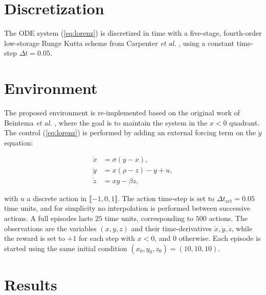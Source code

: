 \section{Discretization}

The ODE system (\ref{eq:lorenz}) is discretized in time with a five-stage, fourth-order low-storage Runge Kutta scheme from Carpenter \textit{et al.} \cite{carpenter1994}, using a constant time-step $\Delta t=0.05$.

\section{Environment}

The proposed environment is re-implemented based on the original work of Beintema \textit{et al.} \cite{beintema2020}, where the goal is to maintain the system in the $x<0$ quadrant. The control (\ref{eq:lorenz}) is performed by adding an external forcing term on the $\dot{y}$ equation:

\begin{equation}
\label{eq:lorenz}
\begin{split}
	\dot{x} 	&= \sigma (y - x), \\
	\dot{y}	&= x(\rho - z) - y + u, \\
	\dot{z}	&= xy - \beta z,
\end{split}
\end{equation}

with $u$ a discrete action in $\llbracket -1, 0, 1 \rrbracket$. The action time-step is set to $\Delta t_\text{act} = 0.05$ time units, and for simplicity no interpolation is performed between successive actions. A full episodes lasts $25$ time units, corresponding to $500$ actions. The observations are the variables $(x, y, z)$ and their time-derivatives $\dot{x}, \dot{y}, \dot{z}$, while the reward is set to $+1$ for each step with $x<0$, and $0$ otherwise. Each episode is started using the same initial condition $(x_0, y_0, z_0) = (10,10,10)$.

\section{Results}

